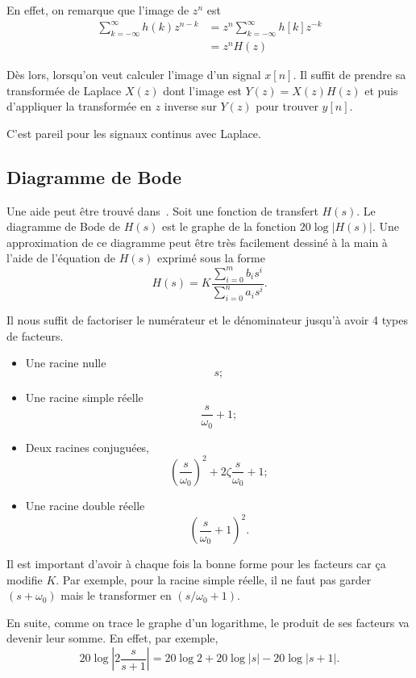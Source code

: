 En effet, on remarque que l'image de $z^n$ est
\begin{align*}
  \sum_{k=-\infty}^{\infty} h(k) z^{n-k} &
  = z^{n} \sum_{k=-\infty}^{\infty} h[k] z^{-k}\\
  & = z^n H(z)
\end{align*}

Dès lors, lorsqu'on veut calculer l'image d'un signal $x[n]$. Il suffit de
prendre sa transformée de Laplace $X(z)$ dont l'image est $Y(z) = X(z) H(z)$
et puis d'appliquer la transformée en $z$ inverse sur $Y(z)$ pour trouver
$y[n]$.

C'est pareil pour les signaux continus avec Laplace.

\subsection{Diagramme de Bode}
Une aide peut être trouvé dans~\cite[pp.~251-253]{astrom2010feedback}.
Soit une fonction de transfert $H(s)$.
Le diagramme de Bode de $H(s)$ est le graphe de la fonction $20\log|H(s)|$.
Une approximation de ce diagramme peut être très facilement dessiné à la main
à l'aide de l'équation de $H(s)$ exprimé sous la forme
\[ H(s) = K \frac{\sum_{i=0}^mb_is^i}{\sum_{i=0}^na_is^i}. \]

Il nous suffit de factoriser le numérateur et le dénominateur
jusqu'à avoir 4 types de facteurs.
\begin{itemize}
  \item Une racine nulle
    \[ s; \]
  \item Une racine simple réelle
    \[ \frac{s}{\omega_0} + 1; \]
  \item Deux racines conjuguées,
    \[ \left(\frac{s}{\omega_0}\right)^2 +
    2\zeta\frac{s}{\omega_0} + 1; \]
  \item Une racine double réelle
    \[ \left(\frac{s}{\omega_0} + 1\right)^2. \]
\end{itemize}
Il est important d'avoir à chaque fois la bonne forme pour les facteurs
car ça modifie $K$.
Par exemple, pour la racine simple réelle, il ne faut pas garder
$(s + \omega_0)$ mais le transformer en $(s/\omega_0 + 1)$.

En suite, comme on trace le graphe d'un logarithme,
le produit de ses facteurs va devenir leur somme.
En effet, par exemple,
\[ 20\log\left|2\frac{s}{s + 1}\right| =
20\log 2 + 20\log|s| - 20\log|s+1|. \]

